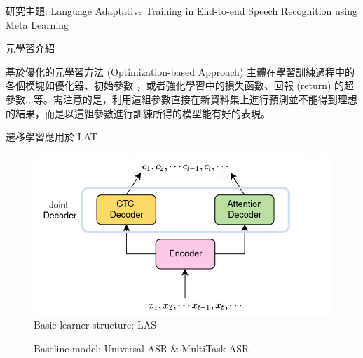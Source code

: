 \documentclass[12pt,UTF8,fntef]{article}
\begin{document}
\begin{section}{研究主題: Language Adaptative Training in End-to-end Speech Recognition using Meta Learning}
\begin{subsection}{元學習介紹}
    \begin{subsubsection}{基於優化的元學習方法 (Optimization-based Approach)} \label{opt-meta}
主體在學習訓練過程中的各個模塊如優化器\cite{ravi2016optimization}、初始參數\cite{nichol2018first, finn2017model,flennerhag2018transferring} ，或者強化學習中的損失函數、回報 (return) 的超參數...等。需注意的是，利用這組參數直接在新資料集上進行預測並不能得到理想的結果，而是以這組參數進行訓練所得的模型能有好的表現。
    \end{subsubsection}
  \end{subsection}
  \newpage

  \begin{subsection}{遷移學習應用於 LAT} \label{trans-asr}

  \begin{figure}[ht]
      \centering
      \includegraphics[width=0.6\linewidth]{monoASR.png}
      \caption{Basic learner structure: LAS}
      \label{fig:monoASR}
  \end{figure}

  \vspace{-0.25in}

  \begin{figure}[ht]
    \centering
    \caption{Baseline model: Universal ASR \& MultiTask ASR}
  \end{figure}


\end{subsection}
\end{section}
\end{document}

